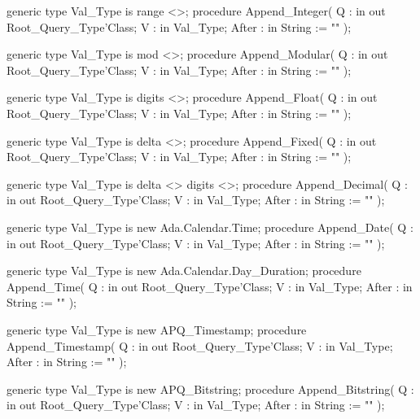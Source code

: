 \documentclass[english,letterpaper]{book}
\begin{document}
\begin{Code}
generic
   type Val_Type is range <>;
procedure Append_Integer(
   Q :     in out Root_Query_Type'Class;
   V :     in     Val_Type;
   After : in     String := ""
);
\end{Code}

\begin{Code}
generic
   type Val_Type is mod <>;
procedure Append_Modular(
   Q :     in out Root_Query_Type'Class;
   V :     in     Val_Type;
   After : in     String := ""
);
\end{Code}

\begin{Code}
generic
   type Val_Type is digits <>;
procedure Append_Float(
   Q :     in out Root_Query_Type'Class;
   V :     in     Val_Type;
   After : in     String := ""
);
\end{Code}

\begin{Code}
generic
   type Val_Type is delta <>;
procedure Append_Fixed(
   Q :     in out Root_Query_Type'Class;
   V :     in     Val_Type;
   After : in     String := ""
);
\end{Code}

\begin{Code}
generic
   type Val_Type is delta <> digits <>;
procedure Append_Decimal(
   Q :     in out Root_Query_Type'Class;
   V :     in     Val_Type;
   After : in     String := ""
);
\end{Code}

\begin{Code}
generic
   type Val_Type is new Ada.Calendar.Time;
procedure Append_Date(
   Q :     in out Root_Query_Type'Class;
   V :     in     Val_Type;
   After : in     String := ""
);
\end{Code}

\begin{Code}
generic
   type Val_Type is new Ada.Calendar.Day_Duration;
procedure Append_Time(
   Q :     in out Root_Query_Type'Class;
   V :     in     Val_Type;
   After : in     String := ""
);
\end{Code}

\begin{Code}
generic
   type Val_Type is new APQ_Timestamp;
procedure Append_Timestamp(
   Q :     in out Root_Query_Type'Class;
   V :     in     Val_Type;
   After : in     String := ""
);
\end{Code}

\begin{Code}
generic
   type Val_Type is new APQ_Bitstring;
procedure Append_Bitstring(
   Q :     in out Root_Query_Type'Class;
   V :     in     Val_Type;
   After : in     String := ""
);
\end{Code}
\end{document}
